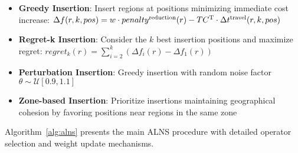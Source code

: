 \begin{itemize}
    \item \textbf{Greedy Insertion}: Insert regions at positions minimizing immediate cost increase:
          $\Delta f(r, k, pos) = w \cdot penalty^{\text{reduction}}(r) - TC^{\text{T}} \cdot \Delta t^{\text{travel}}(r, k, pos)$
    \item \textbf{Regret-k Insertion}: Consider the $k$ best insertion positions and maximize regret:
          $regret_k(r) = \sum_{i=2}^{k} (\Delta f_i(r) - \Delta f_1(r))$
    \item \textbf{Perturbation Insertion}: Greedy insertion with random noise factor $\theta \sim \mathcal{U}[0.9, 1.1]$
    \item \textbf{Zone-based Insertion}: Prioritize insertions maintaining geographical cohesion by favoring positions near regions in the same zone
\end{itemize}

Algorithm~\ref{alg:alns} presents the main ALNS procedure with detailed operator selection and weight update mechanisms.

